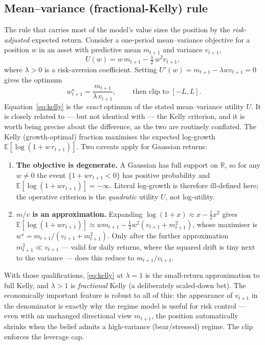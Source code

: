 \documentclass[11pt]{article}
\newcommand{\R}{\mathbb{R}}
\newcommand{\E}{\mathbb{E}}
\newcommand{\obs}{r}
\theoremstyle{plain}
\theoremstyle{definition}
\theoremstyle{remark}
\begin{document}
\subsection{Mean--variance (fractional-Kelly) rule}\label{sec:kelly}
The rule that carries most of the model's value sizes the position by the
\emph{risk-adjusted} expected return. Consider a one-period mean--variance
objective for a position $w$ in an asset with predictive mean $m_{t+1}$ and
variance $v_{t+1}$,
\begin{equation}
  U(w) = w\,m_{t+1} - \tfrac{\lambda}{2}\, w^2 v_{t+1},
\end{equation}
where $\lambda>0$ is a risk-aversion coefficient. Setting $U'(w)=m_{t+1}-\lambda
w v_{t+1}=0$ gives the optimum
\begin{equation}\label{eq:kelly}
  \boxed{\;w_{t+1}^\star = \frac{m_{t+1}}{\lambda\, v_{t+1}},\;}
  \qquad\text{then clip to } [-L,L].
\end{equation}
Equation~\eqref{eq:kelly} is the \emph{exact} optimum of the stated
mean--variance utility $U$. It is closely related to --- but not identical with
--- the Kelly criterion, and it is worth being precise about the difference, as
the two are routinely conflated. The Kelly (growth-optimal) fraction maximises
the expected log-growth $\E[\log(1+w\,\obs_{t+1})]$. Two caveats apply for
Gaussian returns:
\begin{enumerate}[label=(\roman*),leftmargin=2em]
  \item \textbf{The objective is degenerate.} A Gaussian has full support on
        $\R$, so for any $w\ne 0$ the event $\{1+w\obs_{t+1}<0\}$ has positive
        probability and $\E[\log(1+w\obs_{t+1})]=-\infty$. Literal log-growth is
        therefore ill-defined here; the operative criterion is the
        \emph{quadratic} utility $U$, not log-utility.
  \item \textbf{$m/v$ is an approximation.} Expanding
        $\log(1+x)\approx x-\tfrac12 x^2$ gives
        $\E[\log(1+w\obs_{t+1})]\approx w m_{t+1}-\tfrac12 w^2(v_{t+1}+m_{t+1}^2)$,
        whose maximiser is $w^\star = m_{t+1}/(v_{t+1}+m_{t+1}^2)$. Only after the
        further approximation $m_{t+1}^2\ll v_{t+1}$ --- valid for daily returns,
        where the squared drift is tiny next to the variance --- does this reduce
        to $m_{t+1}/v_{t+1}$.
\end{enumerate}
With those qualifications, \eqref{eq:kelly} at $\lambda=1$ is the
small-return approximation to full Kelly, and $\lambda>1$ is \emph{fractional}
Kelly (a deliberately scaled-down bet). The economically important feature is
robust to all of this: the appearance of $v_{t+1}$ in the denominator is exactly
why the regime model is useful for risk control --- even with an unchanged
directional view $m_{t+1}$, the position automatically shrinks when the belief
admits a high-variance (bear/stressed) regime. The clip enforces the leverage
cap.
\end{document}
